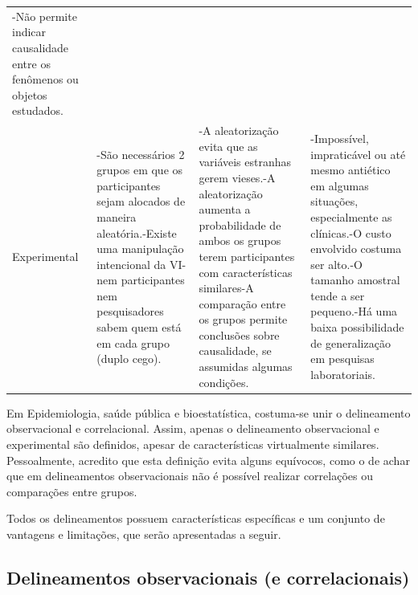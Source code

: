 \documentclass[
]{book}
\begin{document}
\begin{longtable}[]{@{}llll@{}}
\begin{minipage}[t]{0.22\columnwidth}
-Não permite indicar causalidade entre os fenômenos ou objetos estudados.\strut
\end{minipage}\tabularnewline
\begin{minipage}[t]{0.22\columnwidth}\raggedright
Experimental\strut
\end{minipage} & \begin{minipage}[t]{0.22\columnwidth}\raggedright
-São necessários 2 grupos em que os participantes sejam alocados de maneira aleatória.-Existe uma manipulação intencional da VI-nem participantes nem pesquisadores sabem quem está em cada grupo (duplo cego).\strut
\end{minipage} & \begin{minipage}[t]{0.22\columnwidth}\raggedright
-A aleatorização evita que as variáveis estranhas gerem vieses.-A aleatorização aumenta a probabilidade de ambos os grupos terem participantes com características similares-A comparação entre os grupos permite conclusões sobre causalidade, se assumidas algumas condições.\strut
\end{minipage} & \begin{minipage}[t]{0.22\columnwidth}\raggedright
-Impossível, impraticável ou até mesmo antiético em algumas situações, especialmente as clínicas.-O custo envolvido costuma ser alto.-O tamanho amostral tende a ser pequeno.-Há uma baixa possibilidade de generalização em pesquisas laboratoriais.\strut
\end{minipage}\tabularnewline
\bottomrule
\end{longtable}

Em Epidemiologia, saúde pública e bioestatística, costuma-se unir o delineamento observacional e correlacional. Assim, apenas o delineamento observacional e experimental são definidos, apesar de características virtualmente similares. Pessoalmente, acredito que esta definição evita alguns equívocos, como o de achar que em delineamentos observacionais não é possível realizar correlações ou comparações entre grupos.

Todos os delineamentos possuem características específicas e um conjunto de vantagens e limitações, que serão apresentadas a seguir.

\hypertarget{delineamentos-observacionais-e-correlacionais}{%
\subsection{Delineamentos observacionais (e correlacionais)}\label{delineamentos-observacionais-e-correlacionais}}
\end{document}
